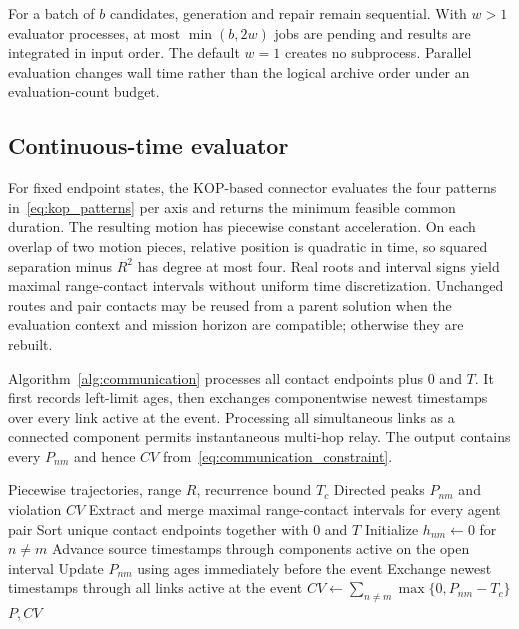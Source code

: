 For a batch of $b$ candidates, generation and repair remain sequential. With $w>1$ evaluator processes, at most $\min(b,2w)$ jobs are pending and results are integrated in input order. The default $w=1$ creates no subprocess. Parallel evaluation changes wall time rather than the logical archive order under an evaluation-count budget.

\subsection{Continuous-time evaluator}
For fixed endpoint states, the KOP-based connector evaluates the four patterns in~\eqref{eq:kop_patterns} per axis and returns the minimum feasible common duration. The resulting motion has piecewise constant acceleration. On each overlap of two motion pieces, relative position is quadratic in time, so squared separation minus $R^2$ has degree at most four. Real roots and interval signs yield maximal range-contact intervals without uniform time discretization. Unchanged routes and pair contacts may be reused from a parent solution when the evaluation context and mission horizon are compatible; otherwise they are rebuilt.

Algorithm~\ref{alg:communication} processes all contact endpoints plus $0$ and $T$. It first records left-limit ages, then exchanges componentwise newest timestamps over every link active at the event. Processing all simultaneous links as a connected component permits instantaneous multi-hop relay. The output contains every $P_{nm}$ and hence $CV$ from~\eqref{eq:communication_constraint}.

\begin{algorithm}[t]
\caption{Event-based temporal communication evaluation}
\label{alg:communication}
\begin{algorithmic}[1]
\Require Piecewise trajectories, range $R$, recurrence bound $T_c$
\Ensure Directed peaks $P_{nm}$ and violation $CV$
\State Extract and merge maximal range-contact intervals for every agent pair
\State Sort unique contact endpoints together with $0$ and $T$
\State Initialize $h_{nm}\gets0$ for $n\ne m$
    \State Advance source timestamps through components active on the open interval
    \State Update $P_{nm}$ using ages immediately before the event
    \State Exchange newest timestamps through all links active at the event
\EndFor
\State $CV\gets\sum_{n\ne m}\max\{0,P_{nm}-T_c\}$
\State \Return $P, CV$
\end{algorithmic}
\end{algorithm}

